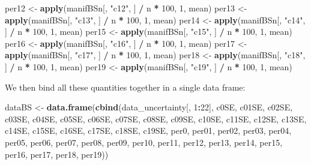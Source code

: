 \documentclass[
]{book}
\newenvironment{Shaded}{\begin{snugshade}}{\end{snugshade}}
\newcommand{\DecValTok}[1]{\textcolor[rgb]{0.00,0.00,0.81}{#1}}
\newcommand{\FunctionTok}[1]{\textcolor[rgb]{0.13,0.29,0.53}{\textbf{#1}}}
\newcommand{\NormalTok}[1]{#1}
\newcommand{\OtherTok}[1]{\textcolor[rgb]{0.56,0.35,0.01}{#1}}
\newcommand{\SpecialCharTok}[1]{\textcolor[rgb]{0.81,0.36,0.00}{\textbf{#1}}}
\newcommand{\StringTok}[1]{\textcolor[rgb]{0.31,0.60,0.02}{#1}}
\begin{document}
\begin{Shaded}
\begin{Highlighting}[]
\NormalTok{per12 }\OtherTok{\textless{}{-}} \FunctionTok{apply}\NormalTok{(manifBSn[, }\StringTok{"c12"}\NormalTok{, ] }\SpecialCharTok{/}\NormalTok{ n }\SpecialCharTok{*} \DecValTok{100}\NormalTok{, }\DecValTok{1}\NormalTok{, mean)}
\NormalTok{per13 }\OtherTok{\textless{}{-}} \FunctionTok{apply}\NormalTok{(manifBSn[, }\StringTok{"c13"}\NormalTok{, ] }\SpecialCharTok{/}\NormalTok{ n }\SpecialCharTok{*} \DecValTok{100}\NormalTok{, }\DecValTok{1}\NormalTok{, mean)}
\NormalTok{per14 }\OtherTok{\textless{}{-}} \FunctionTok{apply}\NormalTok{(manifBSn[, }\StringTok{"c14"}\NormalTok{, ] }\SpecialCharTok{/}\NormalTok{ n }\SpecialCharTok{*} \DecValTok{100}\NormalTok{, }\DecValTok{1}\NormalTok{, mean)}
\NormalTok{per15 }\OtherTok{\textless{}{-}} \FunctionTok{apply}\NormalTok{(manifBSn[, }\StringTok{"c15"}\NormalTok{, ] }\SpecialCharTok{/}\NormalTok{ n }\SpecialCharTok{*} \DecValTok{100}\NormalTok{, }\DecValTok{1}\NormalTok{, mean)}
\NormalTok{per16 }\OtherTok{\textless{}{-}} \FunctionTok{apply}\NormalTok{(manifBSn[, }\StringTok{"c16"}\NormalTok{, ] }\SpecialCharTok{/}\NormalTok{ n }\SpecialCharTok{*} \DecValTok{100}\NormalTok{, }\DecValTok{1}\NormalTok{, mean)}
\NormalTok{per17 }\OtherTok{\textless{}{-}} \FunctionTok{apply}\NormalTok{(manifBSn[, }\StringTok{"c17"}\NormalTok{, ] }\SpecialCharTok{/}\NormalTok{ n }\SpecialCharTok{*} \DecValTok{100}\NormalTok{, }\DecValTok{1}\NormalTok{, mean)}
\NormalTok{per18 }\OtherTok{\textless{}{-}} \FunctionTok{apply}\NormalTok{(manifBSn[, }\StringTok{"c18"}\NormalTok{, ] }\SpecialCharTok{/}\NormalTok{ n }\SpecialCharTok{*} \DecValTok{100}\NormalTok{, }\DecValTok{1}\NormalTok{, mean)}
\NormalTok{per19 }\OtherTok{\textless{}{-}} \FunctionTok{apply}\NormalTok{(manifBSn[, }\StringTok{"c19"}\NormalTok{, ] }\SpecialCharTok{/}\NormalTok{ n }\SpecialCharTok{*} \DecValTok{100}\NormalTok{, }\DecValTok{1}\NormalTok{, mean)}
\end{Highlighting}
\end{Shaded}

We then bind all these quantities together in a single data frame:

\begin{Shaded}
\begin{Highlighting}[]
\NormalTok{dataBS }\OtherTok{\textless{}{-}} \FunctionTok{data.frame}\NormalTok{(}\FunctionTok{cbind}\NormalTok{(data\_uncertainty[, }\DecValTok{1}\SpecialCharTok{:}\DecValTok{22}\NormalTok{], c0SE, c01SE, c02SE, c03SE, c04SE,}
\NormalTok{    c05SE, c06SE, c07SE, c08SE, c09SE, c10SE, c11SE, c12SE, c13SE, c14SE, c15SE,}
\NormalTok{    c16SE, c17SE, c18SE, c19SE, per0, per01, per02, per03, per04, per05, per06, per07,}
\NormalTok{    per08, per09, per10, per11, per12, per13, per14, per15, per16, per17, per18,}
\NormalTok{    per19))}
\end{Highlighting}
\end{Shaded}
\end{document}
